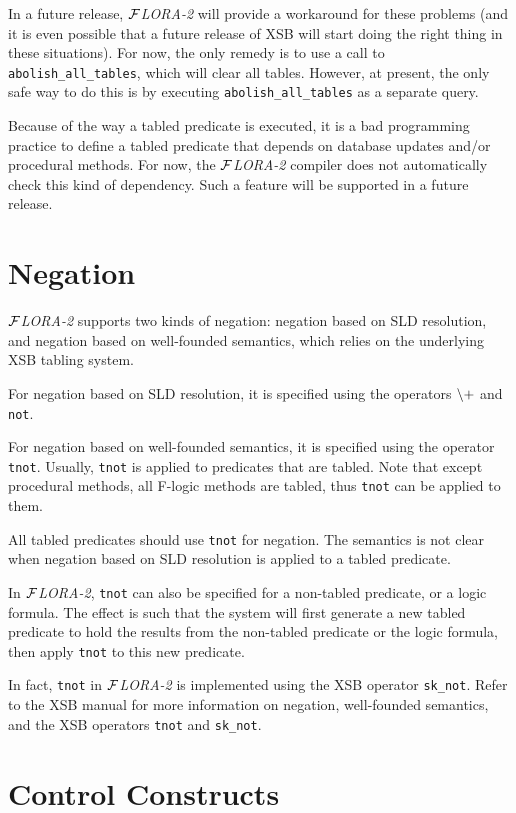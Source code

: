 \documentclass[11pt]{article}
\newcommand{\FLORA}{{\mbox{${\cal F}${\small\it LORA}\rm\emph{-2}}}\xspace}
\newcommand{\fl}{\mbox{F-logic}\xspace}
\newcommand{\NAF}{{$\tt\backslash +$}\xspace}
\begin{document}
In a future release, \FLORA will provide a workaround for these
problems (and it is even possible that a future release of XSB will
start doing the right thing in these situations). For now, the only
remedy is to use a call to {\tt abolish\_all\_tables}, which will
clear all tables.  However, at present, the only safe way to do this
is by executing {\tt abolish\_all\_tables} as a separate query.

Because of the way a tabled predicate is executed, it is a bad
programming practice to define a tabled predicate that depends on
database updates and/or procedural methods. For now, the \FLORA
compiler does not automatically check this kind of dependency. Such
a feature will be supported in a future release.


\section{Negation} \label{sec:negation}


\FLORA supports two kinds of negation: negation based on SLD resolution,
and negation based on well-founded semantics, which relies on the
underlying XSB tabling system.

For negation based on SLD resolution, it is specified using the operators
\NAF and {\tt not}.

For negation based on well-founded semantics, it is specified using the
operator {\tt tnot}. Usually, {\tt tnot} is applied to predicates that
are tabled. Note that except procedural methods, all \fl methods are
tabled, thus {\tt tnot} can be applied to them.

All tabled predicates should use {\tt tnot} for negation. The
semantics is not clear when negation based on SLD resolution is
applied to a tabled predicate.

In \FLORA, {\tt tnot} can also be specified for a non-tabled
predicate, or a logic formula. The effect is such that the system will
first generate a new tabled predicate to hold the results from the
non-tabled predicate or the logic formula, then apply {\tt tnot} to
this new predicate.

In fact, {\tt tnot} in \FLORA is implemented using the XSB operator
\verb|sk_not|. Refer to the XSB manual for more information on
negation, well-founded semantics, and the XSB operators {\tt tnot} and
\verb|sk_not|.



\section{Control Constructs}
\end{document}
